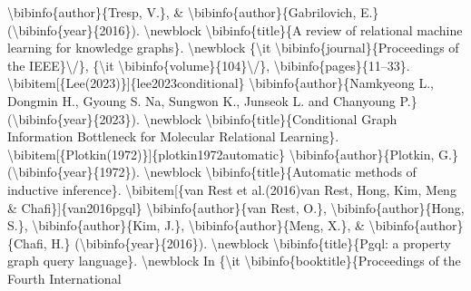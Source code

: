 \documentclass{article}%
\begin{document}
\textbackslash{}bibinfo\{author\}\{Tresp, V.\}, \& \textbackslash{}bibinfo\{author\}\{Gabrilovich, E.\}\newline%
(\textbackslash{}bibinfo\{year\}\{2016\}).\newline%
\textbackslash{}newblock \textbackslash{}bibinfo\{title\}\{A review of relational machine learning for knowledge\newline%
graphs\}.\newline%
\textbackslash{}newblock \{\textbackslash{}it \textbackslash{}bibinfo\{journal\}\{Proceedings of the IEEE\}\textbackslash{}/\}, \{\textbackslash{}it\newline%
\textbackslash{}bibinfo\{volume\}\{104\}\textbackslash{}/\}, \textbackslash{}bibinfo\{pages\}\{11–33\}.\newline%
\textbackslash{}bibitem{[}\{Lee(2023)\}{]}\{lee2023conditional\}\newline%
\textbackslash{}bibinfo\{author\}\{Namkyeong L., Dongmin H., Gyoung S. Na, Sungwon K., Junseok L. and Chanyoung P.\} (\textbackslash{}bibinfo\{year\}\{2023\}).\newline%
\textbackslash{}newblock \textbackslash{}bibinfo\{title\}\{Conditional Graph Information Bottleneck for Molecular Relational Learning\}.\newline%
\textbackslash{}bibitem{[}\{Plotkin(1972)\}{]}\{plotkin1972automatic\}\newline%
\textbackslash{}bibinfo\{author\}\{Plotkin, G.\} (\textbackslash{}bibinfo\{year\}\{1972\}).\newline%
\textbackslash{}newblock \textbackslash{}bibinfo\{title\}\{Automatic methods of inductive inference\}.\newline%
\textbackslash{}bibitem{[}\{van Rest et al.(2016)van Rest, Hong, Kim, Meng \&\newline%
Chafi\}{]}\{van2016pgql\}\newline%
\textbackslash{}bibinfo\{author\}\{van Rest, O.\}, \textbackslash{}bibinfo\{author\}\{Hong, S.\},\newline%
\textbackslash{}bibinfo\{author\}\{Kim, J.\}, \textbackslash{}bibinfo\{author\}\{Meng, X.\}, \&\newline%
\textbackslash{}bibinfo\{author\}\{Chafi, H.\} (\textbackslash{}bibinfo\{year\}\{2016\}).\newline%
\textbackslash{}newblock \textbackslash{}bibinfo\{title\}\{Pgql: a property graph query language\}.\newline%
\textbackslash{}newblock In \{\textbackslash{}it \textbackslash{}bibinfo\{booktitle\}\{Proceedings of the Fourth International\newline%
\end{document}
